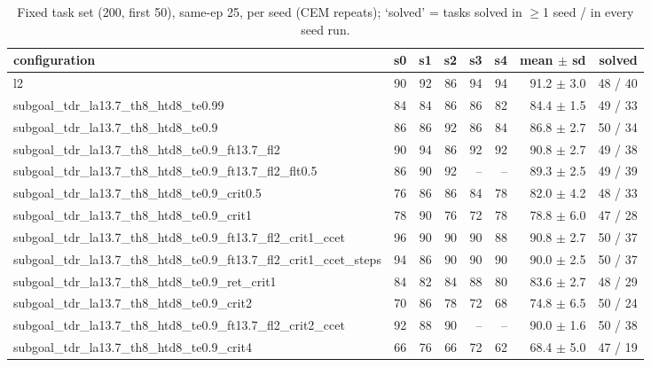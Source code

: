 \begin{table}[H]
\centering\small
\caption{Fixed task set (200, first 50), same-ep 25, per seed (CEM repeats); `solved' = tasks solved in $\ge$1 seed / in every seed run.}
\label{tab:gas-mpc-pooled-same25-task200-n50}
\begin{tabular}{lrrrrrrr}
\toprule
configuration & s0 & s1 & s2 & s3 & s4 & mean $\pm$ sd & solved \\
\midrule
l2 & 90 & 92 & 86 & 94 & 94 & 91.2 $\pm$ 3.0 & 48 / 40 \\
subgoal\_tdr\_la13.7\_th8\_htd8\_te0.99 & 84 & 84 & 86 & 86 & 82 & 84.4 $\pm$ 1.5 & 49 / 33 \\
subgoal\_tdr\_la13.7\_th8\_htd8\_te0.9 & 86 & 86 & 92 & 86 & 84 & 86.8 $\pm$ 2.7 & 50 / 34 \\
subgoal\_tdr\_la13.7\_th8\_htd8\_te0.9\_ft13.7\_fl2 & 90 & 94 & 86 & 92 & 92 & 90.8 $\pm$ 2.7 & 49 / 38 \\
subgoal\_tdr\_la13.7\_th8\_htd8\_te0.9\_ft13.7\_fl2\_flt0.5 & 86 & 90 & 92 & -- & -- & 89.3 $\pm$ 2.5 & 49 / 39 \\
subgoal\_tdr\_la13.7\_th8\_htd8\_te0.9\_crit0.5 & 76 & 86 & 86 & 84 & 78 & 82.0 $\pm$ 4.2 & 48 / 33 \\
subgoal\_tdr\_la13.7\_th8\_htd8\_te0.9\_crit1 & 78 & 90 & 76 & 72 & 78 & 78.8 $\pm$ 6.0 & 47 / 28 \\
subgoal\_tdr\_la13.7\_th8\_htd8\_te0.9\_ft13.7\_fl2\_crit1\_ccet & 96 & 90 & 90 & 90 & 88 & 90.8 $\pm$ 2.7 & 50 / 37 \\
subgoal\_tdr\_la13.7\_th8\_htd8\_te0.9\_ft13.7\_fl2\_crit1\_ccet\_steps & 94 & 86 & 90 & 90 & 90 & 90.0 $\pm$ 2.5 & 50 / 37 \\
subgoal\_tdr\_la13.7\_th8\_htd8\_te0.9\_ret\_crit1 & 84 & 82 & 84 & 88 & 80 & 83.6 $\pm$ 2.7 & 48 / 29 \\
subgoal\_tdr\_la13.7\_th8\_htd8\_te0.9\_crit2 & 70 & 86 & 78 & 72 & 68 & 74.8 $\pm$ 6.5 & 50 / 24 \\
subgoal\_tdr\_la13.7\_th8\_htd8\_te0.9\_ft13.7\_fl2\_crit2\_ccet & 92 & 88 & 90 & -- & -- & 90.0 $\pm$ 1.6 & 50 / 38 \\
subgoal\_tdr\_la13.7\_th8\_htd8\_te0.9\_crit4 & 66 & 76 & 66 & 72 & 62 & 68.4 $\pm$ 5.0 & 47 / 19 \\
\bottomrule
\end{tabular}
\end{table}


